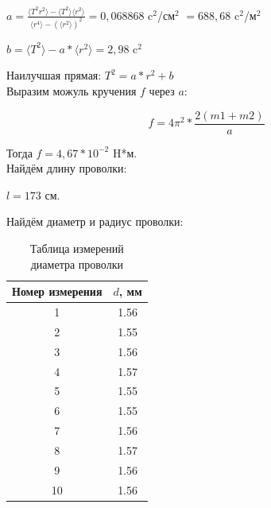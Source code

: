\documentclass[a4paper]{article}
\begin{document}
{{    \item $a = \frac{\langle T^2 r^2 \rangle - \langle T^2 \rangle \langle r^2 \rangle}{\langle r^4 \rangle - (\langle r^2 \rangle)^2} = 0,068868$ c$^2$/см$^2$ $= 688,68$ c$^2$/м$^2$\\
    \item $b = \langle T^2 \rangle - a * \langle r^2 \rangle = 2,98$ c$^2$\\
    \item Наилучшая прямая: $T^2 = a * r^2 + b$\\

    Выразим можуль кручения $f$ через $a$:

    \begin{equation}
        f = {4 \pi^2} * \frac{2(m1+m2)}{a}
    \end{equation}

    \item Тогда $f = 4,67 * 10^{-2}$ H*м.\\

    Найдём длину проволки:

    \item $l = 173$ см.\\

    \newpage

    Найдём диаметр и радиус проволки:
    \begin{table}[h!]
    \begin{center}
    \begin{tabular}{|c|c|}
    \hline

    Номер измерения    & $d$, мм      \\ \hline

    1     & 1.56              \\ \hline
    2     & 1.55              \\ \hline
    3     & 1.56              \\ \hline
    4     & 1.57              \\ \hline
    5     & 1.55              \\ \hline
    6     & 1.55              \\ \hline
    7     & 1.56              \\ \hline
    8     & 1.57              \\ \hline
    9     & 1.56              \\ \hline
    10    & 1.56              \\ \hline

    \end{tabular}
    \caption{Таблица измерений диаметра проволки}
    \end{center}
    \end{table}

}}
\end{document}

